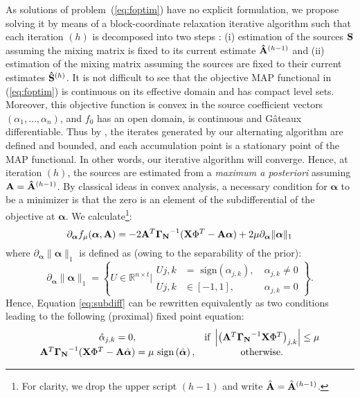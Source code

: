As solutions of problem~(\ref{eq:foptim}) have no explicit formulation, we propose solving it by means of a block-coordinate relaxation 
iterative algorithm such that each iteration $(h)$ is decomposed into two steps : (i) estimation of the sources ${\bf S}$ assuming the 
mixing matrix is fixed to its current estimate ${\bf \hat{A}}^{(h-1)}$ and (ii) estimation of the mixing matrix assuming the sources are 
fixed to their current estimates ${\bf \hat{S}}^{(h)}$. It is not difficult to see that the objective MAP functional in (\ref{eq:foptim}) 
is continuous on its effective domain and has compact level sets. Moreover, this objective function is convex in the source coefficient 
vectors $(\alpha_1,\ldots,\alpha_n)$, and $f_0$ has an open domain, is continuous and G\^ateaux differentiable. Thus by \cite[Theorem 4.1]{Tseng2001}, 
the iterates generated by our alternating algorithm are defined and bounded, and each accumulation point is a stationary point of the MAP 
functional. In other words, our iterative algorithm will converge. Hence, at iteration $(h)$, the sources are estimated from a \textit{maximum a posteriori} 
assuming ${\bf A} = {\bf \hat{A}}^{(h-1)}$. By classical ideas in convex analysis, a necessary condition for ${\boldsymbol \alpha}$ to be 
a minimizer is that the zero is an element of the subdifferential of the objective at ${\boldsymbol \alpha}$. We calculate\footnote{For clarity, 
we drop the upper script $(h-1)$ and write $\hat{\bf A} = \hat{\bf A}^{(h-1)}$.}:
\begin{equation}
\label{eq:subdiff}
\partial_{\boldsymbol \alpha} f_\mu({\boldsymbol \alpha},{\bf A})= -2{\bf {\bf A}}^T{\bf \Gamma_N}^{-1}({\bf X}\Phi^T - {\bf A}{\boldsymbol \alpha}) + 2\mu \partial_{\boldsymbol \alpha} \|{\boldsymbol \alpha}\|_1
\end{equation}
where $\partial_{\boldsymbol \alpha} \|{\boldsymbol \alpha}\|_1$ is defined as (owing to the separability of the prior):
\[
\partial_{\boldsymbol \alpha} \|{\boldsymbol \alpha}\|_1 = \left\{U \in \mathbb{R}^{n \times t} \Bigg| 
\begin{array}{ccc}
U{j,k} & = \mbox{ sign}(\alpha_{j,k}), & ~ \alpha_{j,k} \neq 0 \\
U{j,k} & \in [-1,1], & ~ \alpha_{j,k} = 0
\end{array} \right\}.
\]
Hence, Equation \ref{eq:subdiff} can be rewritten equivalently as two conditions leading to the following (proximal) fixed point equation:
\begin{equation}
\label{eq:it_estim1}
\begin{array}{cc}
\hat{\alpha}_{j,k} = 0, & \text{if} ~ \left|{\left({\bf A}^T{\bf \Gamma_N}^{-1}{\bf X}\Phi^T\right)}_{j,k} \right| \leq \mu \\
{\bf {\bf A}}^T{\bf \Gamma_N}^{-1}({\bf X}\Phi^T - {\bf A}\hat{\boldsymbol \alpha}) = \mu \mbox{ sign}\left(\hat{\boldsymbol \alpha}\right), & \text{otherwise}. 
\end{array}
\end{equation}
